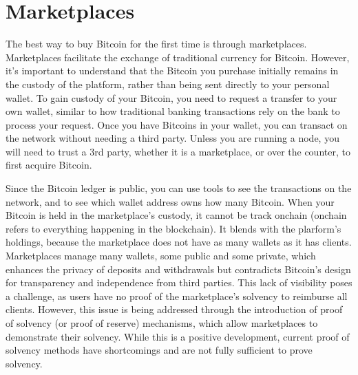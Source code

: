 \section{Marketplaces}
The best way to buy Bitcoin for the first time is through marketplaces. Marketplaces facilitate the exchange of traditional currency for Bitcoin.
However, it's important to understand that the Bitcoin you purchase initially remains in the custody of the platform, rather than being sent directly to your personal wallet.
To gain custody of your Bitcoin, you need to request a transfer to your own wallet, similar to how traditional banking transactions rely on the bank to process your request.
Once you have Bitcoins in your wallet, you can transact on the network without needing a third party.
Unless you are running a node, you will need to trust a 3rd party, whether it is a marketplace, or over the counter, to first acquire Bitcoin.

Since the Bitcoin ledger is public, you can use tools to see the transactions on the network, and to see which wallet address owns how many Bitcoin. 
When your Bitcoin is held in the marketplace's custody, it cannot be track onchain (onchain refers to everything happening in the blockchain). 
It blends with the plarform's holdings, because the marketplace does not have as many wallets as it has clients.
Marketplaces manage many wallets, some public and some private, which enhances the privacy of deposits and withdrawals but contradicts Bitcoin's design for transparency and independence from third parties. 
This lack of visibility poses a challenge, as users have no proof of the marketplace's solvency to reimburse all clients. 
However, this issue is being addressed through the introduction of proof of solvency (or proof of reserve) mechanisms, 
which allow marketplaces to demonstrate their solvency. 
While this is a positive development, current proof of solvency methods have shortcomings and are not fully sufficient to prove solvency.


